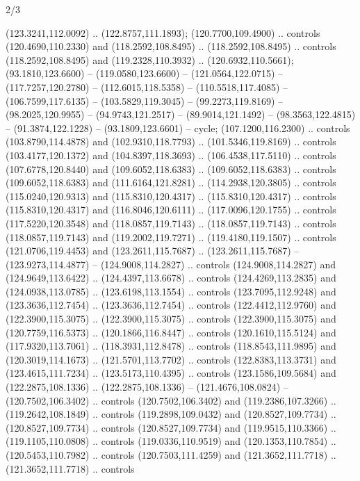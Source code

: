 \begin{flagdescription}{2/3}
\begin{scope}[scale=0.00214\flagwidth,yshift=164.5mm]
\begin{scope}[y=-0.8pt, x=0.8pt, inner sep=0pt, outer sep=0pt]
\begin{scope}[draw=black,fill=dark,line width=0.162pt]
  (123.3241,112.0092) .. (122.8757,111.1893);
 (120.7700,109.4900) .. controls (120.4690,110.2330) and
  (118.2592,108.8495) .. (118.2592,108.8495) .. controls (118.2592,108.8495) and
  (119.2328,110.3932) .. (120.6932,110.5661);
 (93.1810,123.6600) -- (119.0580,123.6600) --
  (121.0564,122.0715) -- (117.7257,120.2780) -- (112.6015,118.5358) --
  (110.5518,117.4085) -- (106.7599,117.6135) -- (103.5829,119.3045) --
  (99.2273,119.8169) -- (98.2025,120.9955) -- (94.9743,121.2517) --
  (89.9014,121.1492) -- (98.3563,122.4815) -- (91.3874,122.1228) --
  (93.1809,123.6601) -- cycle;
 (107.1200,116.2300) .. controls (103.8790,114.4878) and
  (102.9310,118.7793) .. (101.5346,119.8169) .. controls (103.4177,120.1372) and
  (104.8397,118.3693) .. (106.4538,117.5110) .. controls (107.6778,120.8440) and
  (109.6052,118.6383) .. (109.6052,118.6383) .. controls (109.6052,118.6383) and
  (111.6164,121.8281) .. (114.2938,120.3805) .. controls (115.0240,120.9313) and
  (115.8310,120.4317) .. (115.8310,120.4317) .. controls (115.8310,120.4317) and
  (116.8046,120.6111) .. (117.0096,120.1755) .. controls (117.5220,120.3548) and
  (118.0857,119.7143) .. (118.0857,119.7143) .. controls (118.0857,119.7143) and
  (119.2002,119.7271) .. (119.4180,119.1507) .. controls (121.0706,119.4453) and
  (123.2611,115.7687) .. (123.2611,115.7687) -- (123.9273,114.4877) --
  (124.9008,114.2827) .. controls (124.9008,114.2827) and (124.9649,113.6422) ..
  (124.4397,113.6678) .. controls (124.4269,113.2835) and (124.0938,113.0785) ..
  (123.6198,113.1554) .. controls (123.7095,112.9248) and (123.3636,112.7454) ..
  (123.3636,112.7454) .. controls (122.4412,112.9760) and (122.3900,115.3075) ..
  (122.3900,115.3075) .. controls (122.3900,115.3075) and (120.7759,116.5373) ..
  (120.1866,116.8447) .. controls (120.1610,115.5124) and (117.9320,113.7061) ..
  (118.3931,112.8478) .. controls (118.8543,111.9895) and (120.3019,114.1673) ..
  (121.5701,113.7702) .. controls (122.8383,113.3731) and (123.4615,111.7234) ..
  (123.5173,110.4395) .. controls (123.1586,109.5684) and (122.2875,108.1336) ..
  (122.2875,108.1336) -- (121.4676,108.0824) -- (120.7502,106.3402) .. controls
  (120.7502,106.3402) and (119.2386,107.3266) .. (119.2642,108.1849) .. controls
  (119.2898,109.0432) and (120.8527,109.7734) .. (120.8527,109.7734) .. controls
  (120.8527,109.7734) and (119.9515,110.3366) .. (119.1105,110.0808) .. controls
  (119.0336,110.9519) and (120.1353,110.7854) .. (120.5453,110.7982) .. controls
  (120.7503,111.4259) and (121.3652,111.7718) .. (121.3652,111.7718) .. controls

\end{scope}
\end{scope}
\end{scope}
\end{flagdescription}
